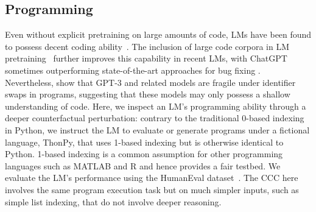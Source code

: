 \subsection{Programming} \label{sec:programming-task}

Even without explicit pretraining on large amounts of code, LMs have been found to possess  decent coding ability~\citep{gpt3}. The inclusion of large code corpora in LM pretraining~ further improves this capability in recent LMs, with  ChatGPT sometimes outperforming state-of-the-art approaches for bug fixing \citep{sobania-2023-analysis}.
Nevertheless, \citet{micelibarone2023larger} show that GPT-3 and related models are fragile under identifier swaps in programs, suggesting that these models may only possess a shallow understanding of code.
Here, we inspect an LM's programming ability through a deeper counterfactual perturbation: contrary to the traditional 0-based indexing in Python, we instruct the LM to evaluate or generate programs under a fictional language, ThonPy, that uses 1-based indexing but is otherwise identical to Python. 1-based indexing is a common assumption for other programming languages such as MATLAB and R and hence provides a fair testbed. We evaluate the LM's performance using the HumanEval dataset~\citep{chen2021codex}.
The CCC here involves the same program execution task but on much simpler inputs, such as simple list indexing, that do not involve deeper reasoning.


